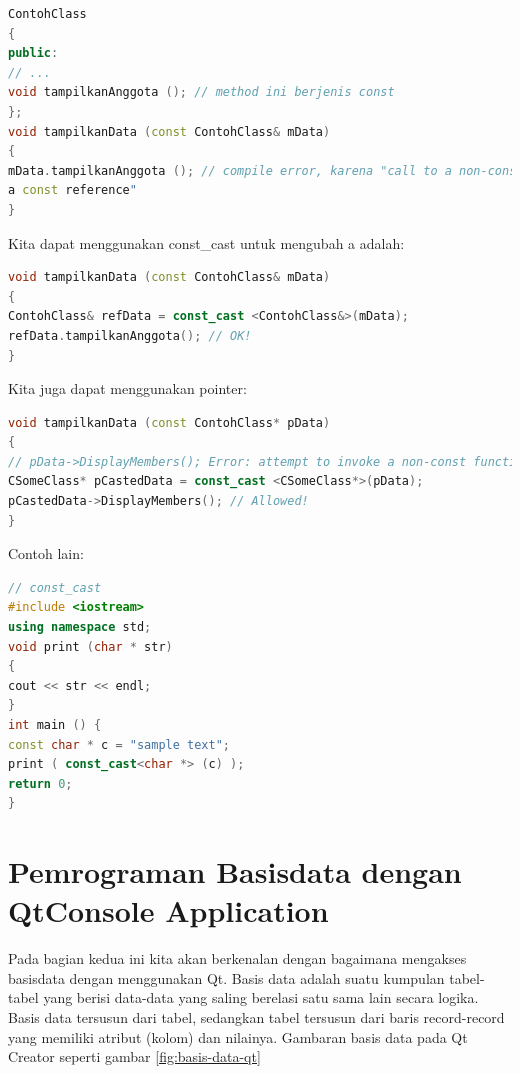 \begin{lstlisting}[language=c++, numbers=none]
ContohClass
{
public:
// ...
void tampilkanAnggota (); // method ini berjenis const
};
void tampilkanData (const ContohClass& mData)
{
mData.tampilkanAnggota (); // compile error, karena "call to a non-const member using
a const reference"
}
\end{lstlisting}

Kita dapat menggunakan const\_cast untuk mengubah a adalah:

\begin{lstlisting}[language=c++, numbers=none]
void tampilkanData (const ContohClass& mData)
{
ContohClass& refData = const_cast <ContohClass&>(mData);
refData.tampilkanAnggota(); // OK!
}
\end{lstlisting}

Kita juga dapat menggunakan pointer:

\begin{lstlisting}[language=c++, numbers=none]
void tampilkanData (const ContohClass* pData)
{
// pData->DisplayMembers(); Error: attempt to invoke a non-const function!
CSomeClass* pCastedData = const_cast <CSomeClass*>(pData);
pCastedData->DisplayMembers(); // Allowed!
}
\end{lstlisting}

Contoh lain:

\begin{lstlisting}[language=c++, numbers=none]
// const_cast
#include <iostream>
using namespace std;
void print (char * str)
{
cout << str << endl;
}
int main () {
const char * c = "sample text";
print ( const_cast<char *> (c) );
return 0;
}
\end{lstlisting}

\section{Pemrograman Basisdata dengan QtConsole Application}\label{pemrograman-basisdata-dengan-qtconsole-application}

Pada bagian kedua ini kita akan berkenalan dengan bagaimana mengakses
basisdata dengan menggunakan Qt. Basis data adalah suatu kumpulan
tabel-tabel yang berisi data-data yang saling berelasi satu sama lain
secara logika. Basis data tersusun dari tabel, sedangkan tabel tersusun
dari baris record-record yang memiliki atribut (kolom) dan nilainya.
Gambaran basis data pada Qt Creator seperti gambar \ref{fig:basis-data-qt}


